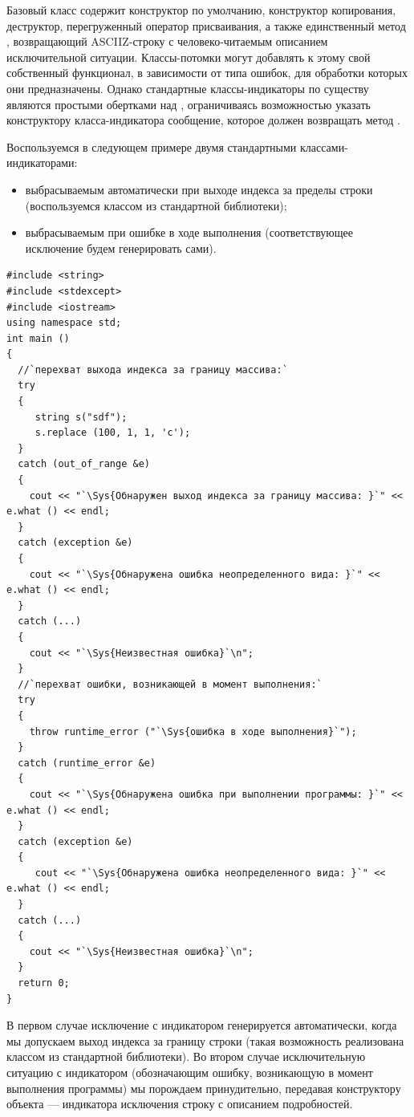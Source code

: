 Базовый класс  содержит конструктор по умолчанию, конструктор копирования, деструктор,
перегруженный оператор присваивания, а также единственный метод , возвращающий
ASCIIZ-строку с человеко-читаемым описанием исключительной ситуации. Классы-потомки могут добавлять к этому свой
собственный функционал, в зависимости от типа ошибок, для обработки которых они предназначены. Однако стандартные
классы-индикаторы по существу являются простыми обертками над , ограничиваясь
возможностью указать конструктору класса-индикатора сообщение, которое должен возвращать метод
. 

Воспользуемся в следующем примере двумя стандартными классами-индикаторами: 

\begin{itemize}
\item выбрасываемым автоматически при выходе индекса за пределы строки (воспользуемся классом 
 из стандартной библиотеки);
\item выбрасываемым при ошибке в ходе выполнения (соответствующее исключение будем генерировать сами).
\end{itemize}
\begin{lstlisting}
#include <string>
#include <stdexcept>
#include <iostream>
using namespace std;
int main ()
{
  //`перехват выхода индекса за границу массива:`
  try 
  {
     string s("sdf");
     s.replace (100, 1, 1, 'c');
  }
  catch (out_of_range &e) 
  {
    cout << "`\Sys{Обнаружен выход индекса за границу массива: }`" << e.what () << endl;
  }
  catch (exception &e) 
  {
    cout << "`\Sys{Обнаружена ошибка неопределенного вида: }`" << e.what () << endl;
  }
  catch (...) 
  {
    cout << "`\Sys{Неизвестная ошибка}`\n";
  }  
  //`перехват ошибки, возникающей в момент выполнения:`
  try 
  {
    throw runtime_error ("`\Sys{ошибка в ходе выполнения}`");
  }
  catch (runtime_error &e) 
  {
    cout << "`\Sys{Обнаружена ошибка при выполнении программы: }`" << e.what () << endl;
  }
  catch (exception &e) 
  {
     cout << "`\Sys{Обнаружена ошибка неопределенного вида: }`" << e.what () << endl;
  }
  catch (...) 
  {
    cout << "`\Sys{Неизвестная ошибка}`\n";
  }       
  return 0;
}
\end{lstlisting}

В первом случае исключение с индикатором  генерируется автоматически, когда мы
допускаем выход индекса за границу строки (такая возможность реализована классом  из
стандартной библиотеки). Во втором случае исключительную ситуацию с индикатором 
(обозначающим ошибку, возникающую в момент выполнения программы) мы порождаем принудительно, передавая конструктору
объекта --- индикатора исключения строку с описанием подробностей. 

